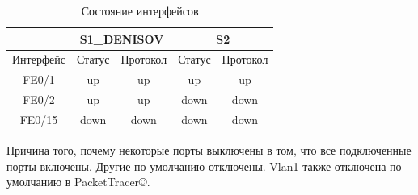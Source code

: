 \documentclass[a4paper,14pt]{extarticle}
\newcommand{\pt}{PacketTracer\copyright}
\begin{document}
\begin{table}[h!]
	\begin{center}
		\caption{Состояние интерфейсов}
	\begin{tabular}{|c|c|c|c|c|}
		\hline
		& \multicolumn{2}{|c|}{S1\_DENISOV}  & \multicolumn{2}{c|}{S2}  \\
		\hline
		Интерфейс & Статус & Протокол & Статус & Протокол \\
		\hline
		FE0/1 & up & up & up & up \\
		FE0/2 &  up & up &  down &  down\\
		FE0/15 &  down &  down&   down &  down\\
		\hline
	\end{tabular}
	\label{tab:interface-status}
	\end{center}
\end{table}
Причина того, почему некоторые порты выключены в том, что все подключенные порты включены. Другие по умолчанию отключены. Vlan1 также отключена по умолчанию в \pt.
\end{document}
